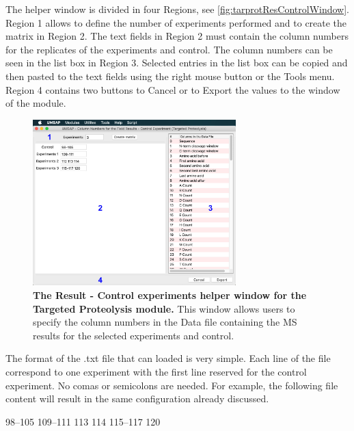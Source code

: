 The helper window is divided in four Regions, see \autoref{fig:tarprotResControlWindow}. Region \num{1} allows to define the number of experiments performed and to create the matrix in Region \num{2}. The text fields in Region \num{2} must contain the column numbers for the replicates of the experiments and control. The column numbers can be seen in the list box in Region \num{3}. Selected entries in the list box can be copied and then pasted to the text fields using the right mouse button or the Tools menu. Region \num{4} contains two buttons to Cancel or to Export the values to the window of the module.   

\begin{figure}[h]
    \centering
    \includegraphics[width=0.7\textwidth]{./IMAGES/MOD-TARPROT/tarprot-rescontrol.jpg}
    \caption[The Result - Control experiments helper window for the Targeted Proteolysis module]{\textbf{The Result - Control experiments helper window for the Targeted Proteolysis module.} This window allows users to specify the column numbers in the Data file containing the MS results for the selected experiments and control.} 
    \label{fig:tarprotResControlWindow}
    \vspace{-5pt} 	
\end{figure}

The format of the .txt file that can loaded is very simple. Each line of the file correspond to one experiment with the first line reserved for the control experiment. No comas or semicolons are needed. For example, the following file content will result in the same configuration already discussed.

\numrange[range-phrase = --]{98}{105} \newline 
\numrange[range-phrase = --]{109}{111}  113 114 \newline
\numrange[range-phrase = --]{115}{117} 120

